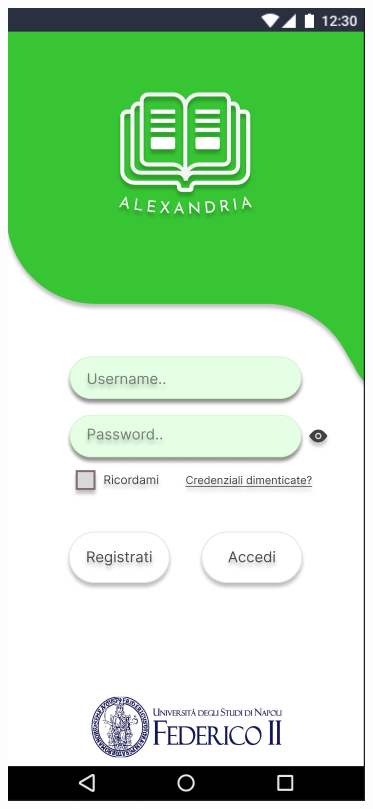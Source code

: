  \begin{figure}
\centering
\begin{minipage}{.5\textwidth}
  \centering
  \includegraphics[width=.60\textwidth]{Immagini/Alexandria/Screen/login.PNG} 
\end{minipage}%
\begin{minipage}{.5\textwidth}
\centering

\end{minipage}
\end{figure}

